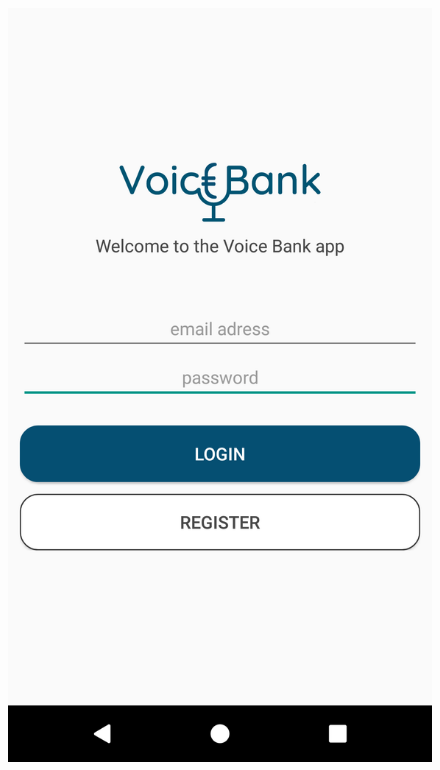 \begin{figure}[h]
  \centering
  \begin{minipage}[b]{0.45\textwidth}
    \includegraphics[width=\textwidth]{bilder/4_appLogin.png}
  \end{minipage}
  \begin{minipage}[b]{0.45\textwidth}

\end{minipage}
\end{figure}
